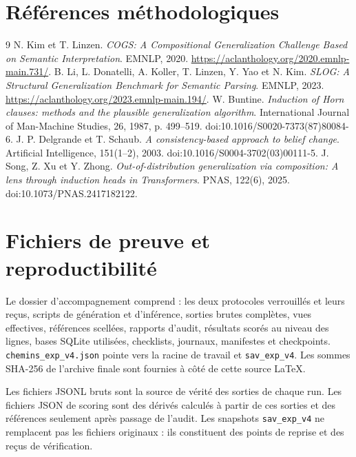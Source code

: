 \documentclass[11pt,a4paper]{article}
\begin{document}
\section{Références méthodologiques}
\begin{thebibliography}{9}
 N. Kim et T. Linzen. \emph{COGS: A Compositional Generalization Challenge Based on Semantic Interpretation}. EMNLP, 2020. \url{https://aclanthology.org/2020.emnlp-main.731/}.
 B. Li, L. Donatelli, A. Koller, T. Linzen, Y. Yao et N. Kim. \emph{SLOG: A Structural Generalization Benchmark for Semantic Parsing}. EMNLP, 2023. \url{https://aclanthology.org/2023.emnlp-main.194/}.
 W. Buntine. \emph{Induction of Horn clauses: methods and the plausible generalization algorithm}. International Journal of Man-Machine Studies, 26, 1987, p. 499--519. doi:10.1016/S0020-7373(87)80084-6.
 J. P. Delgrande et T. Schaub. \emph{A consistency-based approach to belief change}. Artificial Intelligence, 151(1--2), 2003. doi:10.1016/S0004-3702(03)00111-5.
 J. Song, Z. Xu et Y. Zhong. \emph{Out-of-distribution generalization via composition: A lens through induction heads in Transformers}. PNAS, 122(6), 2025. doi:10.1073/PNAS.2417182122.
\end{thebibliography}

\clearpage
\appendix
\section{Fichiers de preuve et reproductibilité}
Le dossier d’accompagnement comprend : les deux protocoles verrouillés et leurs reçus, scripts de génération et d’inférence, sorties brutes complètes, vues effectives, références scellées, rapports d’audit, résultats scorés au niveau des lignes, bases SQLite utilisées, checklists, journaux, manifestes et checkpoints. \texttt{chemins\_exp\_v4.json} pointe vers la racine de travail et \texttt{sav\_exp\_v4}. Les sommes SHA-256 de l’archive finale sont fournies à côté de cette source LaTeX.

Les fichiers JSONL bruts sont la source de vérité des sorties de chaque run. Les fichiers JSON de scoring sont des dérivés calculés à partir de ces sorties et des références seulement après passage de l’audit. Les snapshots \texttt{sav\_exp\_v4} ne remplacent pas les fichiers originaux : ils constituent des points de reprise et des reçus de vérification.
\end{document}
